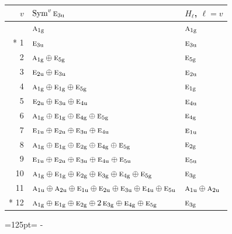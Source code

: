 \documentclass[10pt,a4paper]{article}
\newcommand{\needspace}[1]{\par\penalty-100\begingroup\dimen0=#1\relax\dimen2=\pagegoal
  \advance\dimen2-\pagetotal\ifdim\dimen0>\dimen2\relax\ifdim\dimen2>0pt\vfil\break\fi\fi
  \endgroup}
\numberwithin{equation}{section}
\newcommand{\irr}[1]{\text{\normalfont\scshape #1}}
\newcommand{\ptag}[1]{\mathrm{#1}}
\begin{document}
{\small\begin{longtable}{@{}rll@{}}\toprule
$v$ & $\operatorname{Sym}^{v}\irr{e}_{3\ptag{u}}$ & $H_\ell$, $\ell = v$\\\midrule\endhead
\bottomrule\endfoot\endlastfoot
0 & $\irr{a}_{1\ptag{g}}$ & $\irr{a}_{1\ptag{g}}$\\*
1 & $\irr{e}_{3\ptag{u}}$ & $\irr{e}_{3\ptag{u}}$\\
2 & $\irr{a}_{1\ptag{g}} \oplus \irr{e}_{5\ptag{g}}$ & $\irr{e}_{5\ptag{g}}$\\
3 & $\irr{e}_{2\ptag{u}} \oplus \irr{e}_{3\ptag{u}}$ & $\irr{e}_{2\ptag{u}}$\\
4 & $\irr{a}_{1\ptag{g}} \oplus \irr{e}_{1\ptag{g}} \oplus \irr{e}_{5\ptag{g}}$ & $\irr{e}_{1\ptag{g}}$\\
5 & $\irr{e}_{2\ptag{u}} \oplus \irr{e}_{3\ptag{u}} \oplus \irr{e}_{4\ptag{u}}$ & $\irr{e}_{4\ptag{u}}$\\
6 & $\irr{a}_{1\ptag{g}} \oplus \irr{e}_{1\ptag{g}} \oplus \irr{e}_{4\ptag{g}} \oplus \irr{e}_{5\ptag{g}}$ & $\irr{e}_{4\ptag{g}}$\\
7 & $\irr{e}_{1\ptag{u}} \oplus \irr{e}_{2\ptag{u}} \oplus \irr{e}_{3\ptag{u}} \oplus \irr{e}_{4\ptag{u}}$ & $\irr{e}_{1\ptag{u}}$\\
8 & $\irr{a}_{1\ptag{g}} \oplus \irr{e}_{1\ptag{g}} \oplus \irr{e}_{2\ptag{g}} \oplus \irr{e}_{4\ptag{g}} \oplus \irr{e}_{5\ptag{g}}$ & $\irr{e}_{2\ptag{g}}$\\
9 & $\irr{e}_{1\ptag{u}} \oplus \irr{e}_{2\ptag{u}} \oplus \irr{e}_{3\ptag{u}} \oplus \irr{e}_{4\ptag{u}} \oplus \irr{e}_{5\ptag{u}}$ & $\irr{e}_{5\ptag{u}}$\\
10 & $\irr{a}_{1\ptag{g}} \oplus \irr{e}_{1\ptag{g}} \oplus \irr{e}_{2\ptag{g}} \oplus \irr{e}_{3\ptag{g}} \oplus \irr{e}_{4\ptag{g}} \oplus \irr{e}_{5\ptag{g}}$ & $\irr{e}_{3\ptag{g}}$\\
11 & $\irr{a}_{1\ptag{u}} \oplus \irr{a}_{2\ptag{u}} \oplus \irr{e}_{1\ptag{u}} \oplus \irr{e}_{2\ptag{u}} \oplus \irr{e}_{3\ptag{u}} \oplus \irr{e}_{4\ptag{u}} \oplus \irr{e}_{5\ptag{u}}$ & $\irr{a}_{1\ptag{u}} \oplus \irr{a}_{2\ptag{u}}$\\*
12 & $\irr{a}_{1\ptag{g}} \oplus \irr{e}_{1\ptag{g}} \oplus \irr{e}_{2\ptag{g}} \oplus 2\,\irr{e}_{3\ptag{g}} \oplus \irr{e}_{4\ptag{g}} \oplus \irr{e}_{5\ptag{g}}$ & $\irr{e}_{3\ptag{g}}$\\
\bottomrule\end{longtable}}
\needspace{125pt}
\end{document}

